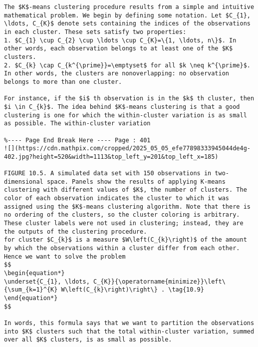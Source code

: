 \documentclass[10pt]{article}
\begin{document}
\begin{verbatim}
The $K$-means clustering procedure results from a simple and intuitive mathematical problem. We begin by defining some notation. Let $C_{1}, \ldots, C_{K}$ denote sets containing the indices of the observations in each cluster. These sets satisfy two properties:
1. $C_{1} \cup C_{2} \cup \ldots \cup C_{K}=\{1, \ldots, n\}$. In other words, each observation belongs to at least one of the $K$ clusters.
2. $C_{k} \cap C_{k^{\prime}}=\emptyset$ for all $k \neq k^{\prime}$. In other words, the clusters are nonoverlapping: no observation belongs to more than one cluster.

For instance, if the $i$ th observation is in the $k$ th cluster, then $i \in C_{k}$. The idea behind $K$-means clustering is that a good clustering is one for which the within-cluster variation is as small as possible. The within-cluster variation

%---- Page End Break Here ---- Page : 401
![](https://cdn.mathpix.com/cropped/2025_05_05_efe77898333945044de4g-402.jpg?height=520&width=1113&top_left_y=201&top_left_x=185)

FIGURE 10.5. A simulated data set with 150 observations in two-dimensional space. Panels show the results of applying K-means clustering with different values of $K$, the number of clusters. The color of each observation indicates the cluster to which it was assigned using the $K$-means clustering algorithm. Note that there is no ordering of the clusters, so the cluster coloring is arbitrary. These cluster labels were not used in clustering; instead, they are the outputs of the clustering procedure.
for cluster $C_{k}$ is a measure $W\left(C_{k}\right)$ of the amount by which the observations within a cluster differ from each other. Hence we want to solve the problem
$$
\begin{equation*}
\underset{C_{1}, \ldots, C_{K}}{\operatorname{minimize}}\left\{\sum_{k=1}^{K} W\left(C_{k}\right)\right\} . \tag{10.9}
\end{equation*}
$$

In words, this formula says that we want to partition the observations into $K$ clusters such that the total within-cluster variation, summed over all $K$ clusters, is as small as possible.


\end{verbatim}
\end{document}
